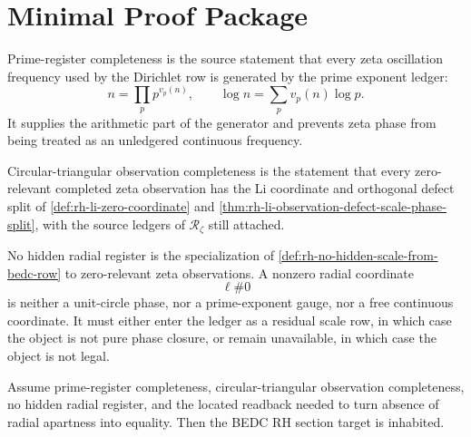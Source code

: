 \section{Minimal Proof Package}
\label{sec:rh-circle-triangle-minimal-proof-package}

\begin{definition}
\label{def:rh-prime-register-completeness}
Prime-register completeness is the source statement that every zeta
oscillation frequency used by the Dirichlet row is generated by the
prime exponent ledger:
$$
n=\prod_p p^{v_p(n)},
\qquad
\log n=\sum_p v_p(n)\log p.
$$
It supplies the arithmetic part of the generator and prevents zeta phase
from being treated as an unledgered continuous frequency.
\end{definition}

\begin{definition}
\label{def:rh-circular-triangular-observation-completeness}
Circular-triangular observation completeness is the statement that every
zero-relevant completed zeta observation has the Li coordinate and
orthogonal defect split of
\autoref{def:rh-li-zero-coordinate} and
\autoref{thm:rh-li-observation-defect-scale-phase-split}, with the
source ledgers of $\mathcal R_{\zeta}$ still attached.
\end{definition}

\begin{definition}
\label{def:rh-no-hidden-radial-register}
No hidden radial register is the specialization of
\autoref{def:rh-no-hidden-scale-from-bedc-row} to zero-relevant zeta
observations. A nonzero radial coordinate
$$
\ell\#0
$$
is neither a unit-circle phase, nor a prime-exponent gauge, nor a free
continuous coordinate. It must either enter the ledger as a residual
scale row, in which case the object is not pure phase closure, or remain
unavailable, in which case the object is not legal.
\end{definition}

\begin{theorem}
\label{thm:rh-minimal-generator-package-conditionally-sufficient}
Assume prime-register completeness, circular-triangular observation
completeness, no hidden radial register, and the located readback needed
to turn absence of radial apartness into equality. Then the BEDC RH
section target is inhabited.
\end{theorem}

